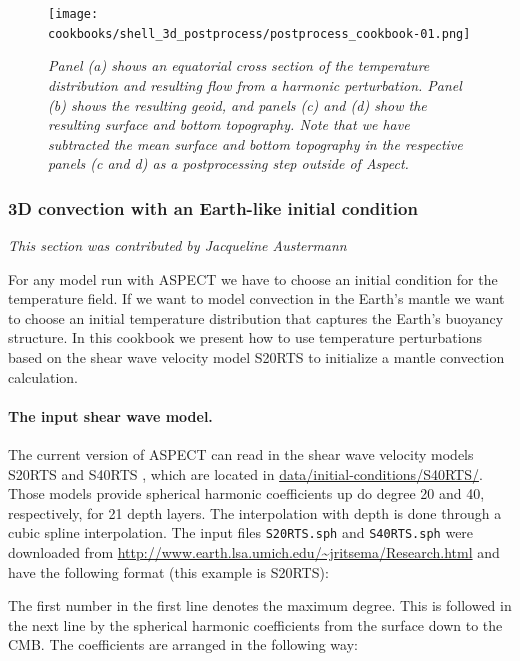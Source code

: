 \documentclass{article}
\newcommand{\aspect}{\textsc{ASPECT}}
\begin{document}
\begin{figure}
  \texttt{[image: cookbooks/shell\_3d\_postprocess/postprocess\_cookbook-01.png]}
  \hfill
  \caption{\it Panel (a) shows an equatorial cross section of the temperature distribution and 
  resulting flow from a harmonic perturbation. Panel (b) shows the resulting geoid, and panels
  (c) and (d) show the resulting surface and bottom topography. Note that we have subtracted
  the mean surface and bottom topography in the respective panels (c and d) as a postprocessing
  step outside of Aspect.
  }
  \label{fig:pp}
\end{figure}

\subsubsection{3D convection with an Earth-like initial condition}
\label{sec:cookbooks-S20RTS}
\textit{This section was contributed by Jacqueline Austermann}

For any model run with \aspect{} we have to choose an initial condition for the 
temperature field. If we want to model convection in the Earth's mantle we want 
to choose an initial temperature distribution that captures the Earth's buoyancy 
structure. In this cookbook we present how to use temperature perturbations 
based on the shear wave velocity model S20RTS \cite{S20RTS} to 
initialize a mantle convection calculation.

\paragraph{The input shear wave model.}

The current version of \aspect{} can read in the shear wave velocity models 
S20RTS \cite{S20RTS} and S40RTS \cite{S40RTS}, which are located 
in \url{data/initial-conditions/S40RTS/}. Those models provide 
spherical harmonic coefficients up do degree 20 and 40, respectively, for 21 
depth layers. The interpolation with depth is done through a cubic spline 
interpolation. The input files \texttt{S20RTS.sph} and \texttt{S40RTS.sph} were
downloaded from \url{http://www.earth.lsa.umich.edu/~jritsema/Research.html} 
and have the following format (this example is S20RTS): 



The first number in the first line denotes the maximum degree. This is followed in 
the next line by the spherical harmonic coefficients from the surface down to the 
CMB. The coefficients are arranged in the following way:\\
\end{document}
